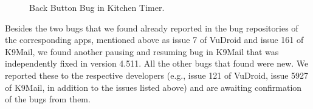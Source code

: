 \begin{figure}[!t]
\centering
{}
\hfill
{}
\hfill
{}
\hfill
{}
\caption{Back Button Bug in Kitchen Timer.}
\label{fig:bug23}
\end{figure}

Besides the two bugs that we found already reported in the bug repositories of the corresponding apps, mentioned above as issue 7 of VuDroid and issue 161 of K9Mail, we found another pausing and resuming bug in K9Mail that was independently fixed in version 4.511. All the other \NumBugs{} bugs that \tool{} found were new.
We reported these to the respective developers (e.g., issue 121 of VuDroid, issue 5927 of K9Mail, in addition to the issues listed above) and are awaiting confirmation of the bugs from them. 

